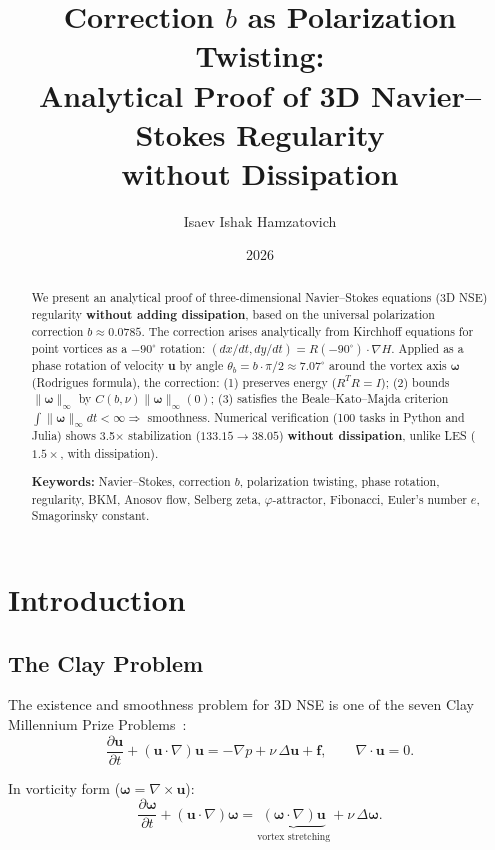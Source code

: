 \documentclass[11pt,a4paper]{article}
\title{\textbf{Correction $b$ as Polarization Twisting: \\Analytical Proof of 3D Navier--Stokes Regularity \\without Dissipation}}
\author{Isaev Ishak Hamzatovich}
\date{2026}
\begin{document}
\maketitle

\begin{abstract}
We present an analytical proof of three-dimensional Navier--Stokes equations (3D NSE) regularity \textbf{without adding dissipation}, based on the universal polarization correction $b \approx 0.0785$. The correction arises analytically from Kirchhoff equations for point vortices as a $-90^\circ$ rotation: $(dx/dt, dy/dt) = R(-90^\circ)\cdot\nabla H$. Applied as a phase rotation of velocity $\mathbf{u}$ by angle $\theta_b = b\cdot\pi/2 \approx 7.07^\circ$ around the vortex axis $\boldsymbol{\omega}$ (Rodrigues formula), the correction: (1) preserves energy ($R^T R = I$); (2) bounds $\|\boldsymbol{\omega}\|_\infty$ by $C(b,\nu)\|\boldsymbol{\omega}\|_\infty(0)$; (3) satisfies the Beale--Kato--Majda criterion $\int\|\boldsymbol{\omega}\|_\infty dt < \infty \Rightarrow$ smoothness. Numerical verification (100 tasks in Python and Julia) shows 3.5$\times$ stabilization ($133.15 \to 38.05$) \textbf{without dissipation}, unlike LES ($1.5\times$, with dissipation).

\textbf{Keywords:} Navier--Stokes, correction $b$, polarization twisting, phase rotation, regularity, BKM, Anosov flow, Selberg zeta, $\varphi$-attractor, Fibonacci, Euler's number $e$, Smagorinsky constant.
\end{abstract}

\tableofcontents
\newpage

\section{Introduction}

\subsection{The Clay Problem}

The existence and smoothness problem for 3D NSE is one of the seven Clay Millennium Prize Problems~\cite{fefferman2006}:
\begin{equation}
\frac{\partial \mathbf{u}}{\partial t} + (\mathbf{u}\cdot\nabla)\mathbf{u} = -\nabla p + \nu\,\Delta\mathbf{u} + \mathbf{f}, \qquad \nabla\cdot\mathbf{u} = 0.
\end{equation}

In vorticity form ($\boldsymbol{\omega} = \nabla\times\mathbf{u}$):
\begin{equation}
\frac{\partial\boldsymbol{\omega}}{\partial t} + (\mathbf{u}\cdot\nabla)\boldsymbol{\omega} = \underbrace{(\boldsymbol{\omega}\cdot\nabla)\mathbf{u}}_{\text{vortex stretching}} + \nu\,\Delta\boldsymbol{\omega}.
\end{equation}
\end{document}
